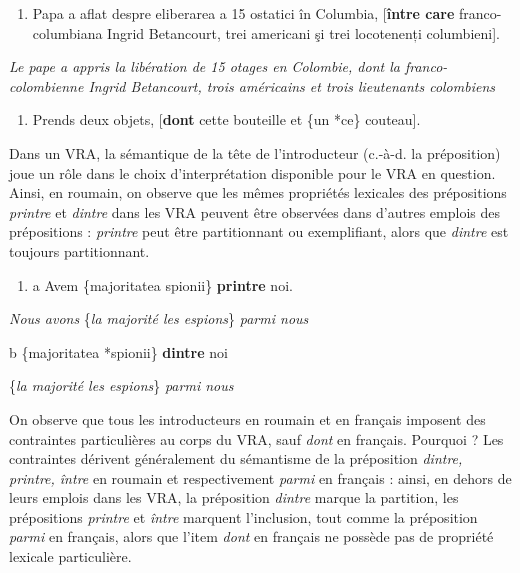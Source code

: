 \begin{enumerate}
\item Papa a aflat despre eliberarea a 15 ostatici în Columbia, [\textbf{între care} franco-columbiana Ingrid Betancourt, trei americani şi trei locotenenți columbieni]. 


\end{enumerate}
{\itshape
Le pape a appris la libération de 15 otages en Colombie, dont la franco-colombienne Ingrid Betancourt, trois américains et trois lieutenants colombiens} 


\begin{enumerate}
\item Prends deux objets, [\textbf{dont} cette bouteille et \{un {\textbar} *ce\} couteau].


\end{enumerate}
Dans un VRA, la sémantique de la tête de l'introducteur (c.-à-d. la préposition) joue un rôle dans le choix d'interprétation disponible pour le VRA en question. Ainsi, en roumain, on observe que les mêmes propriétés lexicales des prépositions \textit{printre} et \textit{dintre} dans les VRA peuvent être observées dans d'autres emplois des prépositions : \textit{printre} peut être partitionnant ou exemplifiant, alors que \textit{dintre} est toujours partitionnant. 


\begin{enumerate}
\item a  Avem \{majoritatea {\textbar} spionii\} \textbf{printre} noi.  


\end{enumerate}
\textit{Nous avons} \{\textit{la majorité {\textbar} les espions}\} \textit{parmi nous}

  b  \{majoritatea {\textbar} *spionii\} \textbf{dintre} noi

\{\textit{la majorité {\textbar} les espions}\} \textit{parmi nous } 

On observe que tous les introducteurs en roumain et en français imposent des contraintes particulières au corps du VRA, sauf \textit{dont} en français. Pourquoi ? Les contraintes dérivent généralement du sémantisme de la préposition \textit{dintre, printre, între} en roumain et respectivement \textit{parmi} en français : ainsi, en dehors de leurs emplois dans les VRA, la préposition \textit{dintre} marque la partition, les prépositions \textit{printre} et \textit{între} marquent l'inclusion, tout comme la préposition \textit{parmi} en français, alors que l'item \textit{dont} en français ne possède pas de propriété lexicale particulière.  

